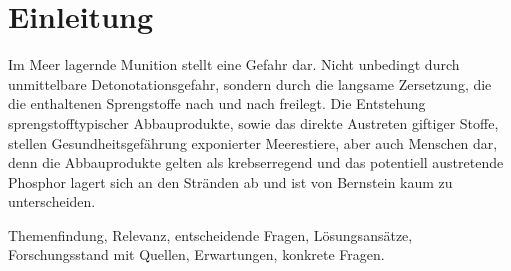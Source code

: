  

\chapter[Einleitung]{Einleitung}

Im Meer lagernde Munition stellt eine Gefahr dar. Nicht unbedingt durch unmittelbare Detonotationsgefahr, sondern durch die langsame Zersetzung, die die enthaltenen Sprengstoffe nach und nach freilegt\cite{zeitbomben}. Die Entstehung sprengstofftypischer Abbauprodukte, sowie das direkte Austreten giftiger Stoffe, stellen Gesundheitsgefährung exponierter Meerestiere, aber auch Menschen dar, denn die Abbauprodukte gelten als krebserregend und das potentiell austretende Phosphor lagert sich an den Stränden ab und ist von Bernstein kaum zu unterscheiden.

Themenfindung, Relevanz, entscheidende Fragen, Lösungsansätze, Forschungsstand mit Quellen, Erwartungen, konkrete Fragen.



